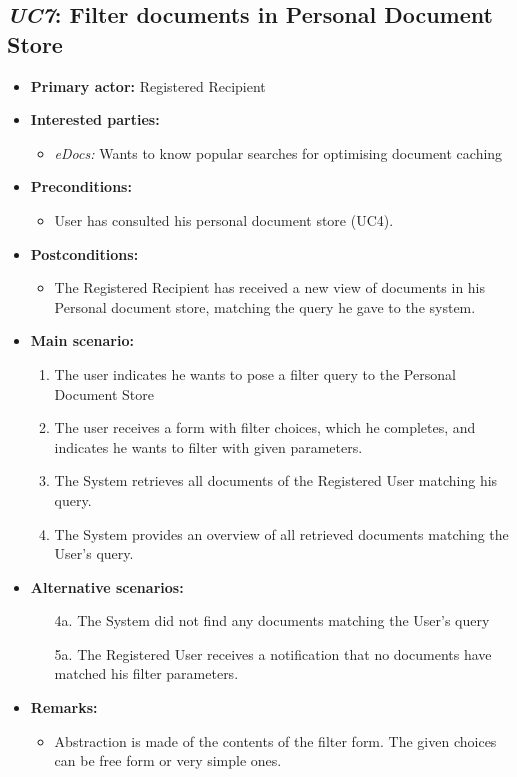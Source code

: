 \documentclass[a4paper,10pt]{article}
\begin{document}
\subsection{\emph{UC7}: Filter documents in Personal Document Store}
\begin{itemize}
    \item \textbf{Primary actor:} Registered Recipient
    \item \textbf{Interested parties:} 
        \begin{itemize}
            \item \textit{eDocs:} Wants to know popular searches for optimising document caching
        \end{itemize}

    \item \textbf{Preconditions:}
        \begin{itemize}
            \item User has consulted his personal document store (UC4).
        \end{itemize}

    \item \textbf{Postconditions:}
        \begin{itemize}
            \item The Registered Recipient has received a new view of documents in his Personal document store, matching the query he gave to the system.
        \end{itemize}
        
    \item \textbf{Main scenario:} 
    \begin{enumerate}
       \item The user indicates he wants to pose a filter query to the Personal Document Store
       \item The user receives a form with filter choices, which he completes, and indicates he wants to filter with given parameters.
       \item The System retrieves all documents of the Registered User matching his query.
       \item The System provides an overview of all retrieved documents matching the User's query.
    \end{enumerate}

    \item \textbf{Alternative scenarios:} 
    \begin{enumerate}
        \item [4a.] The System did not find any documents matching the User's query
        \item [5a.] The Registered User receives a notification that no documents have matched his filter parameters.
    \end{enumerate}
    
    \item \textbf{Remarks:}
        \begin{itemize}
            \item Abstraction is made of the contents of the filter form. The given choices can be free form or very simple ones.
        \end{itemize}
\end{itemize}
\end{document}

